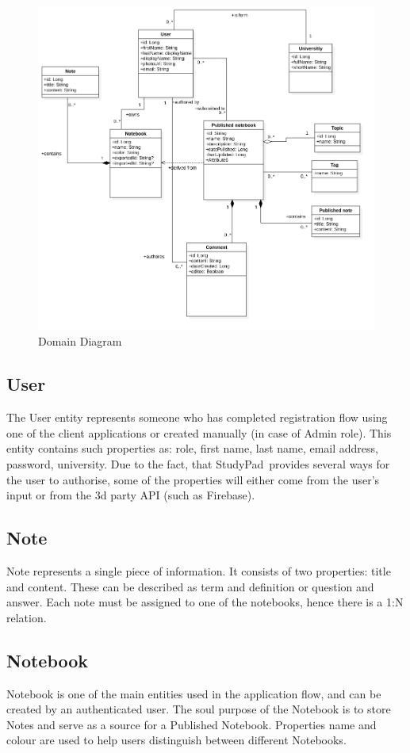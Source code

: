 \documentclass[thesis=B,english]{FITthesis}[2012/10/20]
\newcommand{\appname}{StudyPad}
\begin{document}
\begin{figure}[H]
  \includegraphics[width=\linewidth]{Domain}
  \caption{Domain Diagram}
  \label{fig:domain}
\end{figure}

 

\subsection{User}
	The User entity represents someone who has completed registration flow using one of the client applications or created manually (in case of Admin role). This entity contains such properties as: role, first name, last name, email address, password, university. Due to the fact, that \appname\ provides several ways for the user to authorise, some of the properties will either come from the user's input or from the 3d party API (such as Firebase).
	
\subsection{Note}
	Note represents a single piece of information. It consists of two properties: title and content. These can be described as term and definition or question and answer. Each note must be assigned to one of the notebooks, hence there is a 1:N relation.
\subsection{Notebook}
	Notebook is one of the main entities used in the application flow, and  can be created by an authenticated user. The soul purpose of the Notebook is to store Notes and serve as a source for a Published Notebook. Properties name and colour are used to help users distinguish between different Notebooks.
	
\end{document}
